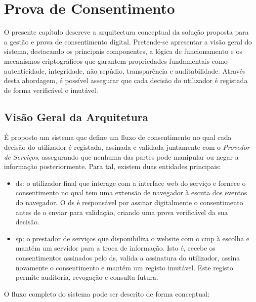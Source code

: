 \chapter{Prova de Consentimento}
\label{cap:arquitectura}

O presente capítulo descreve a arquitectura conceptual da solução proposta para a gestão e prova de consentimento digital. Pretende-se apresentar a visão geral do sistema, destacando os principais componentes, a lógica de funcionamento e os mecanismos criptográficos que garantem propriedades fundamentais como autenticidade, integridade, não repúdio, transparência e auditabilidade. Através desta abordagem, é possível assegurar que cada decisão do utilizador é registada de forma verificável e imutável.

\section{Visão Geral da Arquitetura}

É proposto um sistema que define um fluxo de consentimento no qual cada decisão do utilizador é registada, assinada e validada juntamente com o \textit{Provedor de Serviços}, assegurando que nenhuma das partes pode manipular ou negar a informação posteriormente. Para tal, existem duas entidades principais:

\begin{itemize}
    \item \acrfull{ds}: o utilizador final que interage com a interface web do serviço e fornece o consentimento no qual tem uma extensão de navegador à escuta dos eventos do navegador. O \acrshort{ds} é responsável por assinar digitalmente o consentimento antes de o enviar para validação, criando uma prova verificável da sua decisão.
    \item \acrfull{sp}: o prestador de serviços que disponibiliza o website com o \acrshort{cmp} à escolha e mantém um servidor para a troca de informação. Isto é, recebe os consentimentos assinados pelo \acrshort{ds}, valida a assinatura do utilizador, assina novamente o consentimento e mantém um registo imutável. Este registo permite auditoria, revogação e consulta futura.
\end{itemize}

O fluxo completo do sistema pode ser descrito de forma conceptual:

